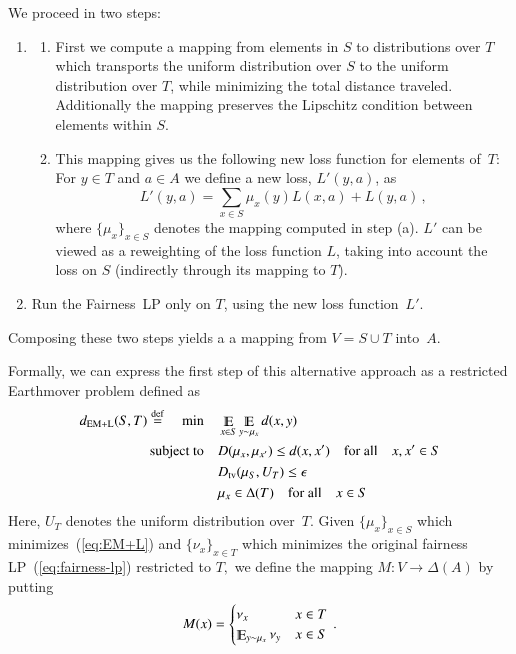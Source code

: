\documentclass[letterpaper,11pt]{article}
\theoremstyle{definition}
\renewcommand{\mathbb}{\varmathbb}
\newcommand{\Esymb}{\mathbb{E}}
\DeclareMathOperator*{\E}{\Esymb}
\newcommand{\mper}{\,.}
\newcommand{\mcom}{\,,}
\newcommand{\defeq}{\stackrel{\small \mathrm{def}}{=}}
\newcommand{\tv}{\mathrm{tv}}
\newcommand\EM{\mathrm{EM}}
\begin{document}
We proceed in two steps:
\begin{enumerate}
\item
\begin{enumerate}
\item
First we compute a mapping from elements in $S$ to distributions over
$T$ which transports the uniform distribution over $S$ to the uniform
distribution over $T$, while minimizing the total distance traveled.
Additionally the mapping preserves the Lipschitz condition between
elements within $S.$
\item
This mapping
gives us the following new loss function for elements of~$T$:
For $y \in T$ and $a \in A$ we define a new loss, $L'(y,a)$, as
\[
L'(y,a) = \sum_{x \in S} \mu_x(y)L(x,a) + L(y,a)\mcom
\]
where $\{\mu_x\}_{x\in S}$ denotes the mapping computed in step (a).
$L'$ can be viewed as a reweighting of the loss function $L$,
taking into account the loss on $S$ (indirectly through its mapping to $T$).

\end{enumerate}
\item Run the Fairness~LP only on $T$, using the new loss function~$L'$.
\end{enumerate}
Composing these two steps yields a
a mapping from $V=S\cup T$ into~$A.$


\medskip
\noindent
Formally, we can express the first step of this alternative approach
as a restricted
Earthmover problem defined as
\begin{align}
\label{eq:EM+L}
d_{\EM+\mathrm{L}}(S,T)\defeq\quad\min\quad
& \E_{x\in S}\E_{y\sim\mu_x} d(x,y)
\\
\text{subject to}\quad
& D(\mu_x,\mu_{x'}) \le d(x,x')   %
\quad \text{for all}\quad x,x'\in S \notag\\
& D_\tv(\mu_S,U_T)\le\epsilon  \notag\\
& \mu_x\in \Delta(T) \quad \text{for all}\quad{x \in S}
\notag
\end{align}
Here, $U_T$ denotes the uniform distribution over~$T.$
Given $\{\mu_x\}_{x\in S}$ which
minimizes~(\ref{eq:EM+L}) and $\{\nu_x\}_{x\in T}$ which minimizes the
original fairness LP~(\ref{eq:fairness-lp}) restricted to $T,$
we define the mapping
$M\colon V\to\Delta(A)$ by putting
\begin{equation}\label{eq:composition}
M(x)=
\begin{cases}
\nu_x & x\in T\\
\E_{y\sim\mu_x}\nu_y & x\in S
\end{cases}\mper
\end{equation}
\end{document}
